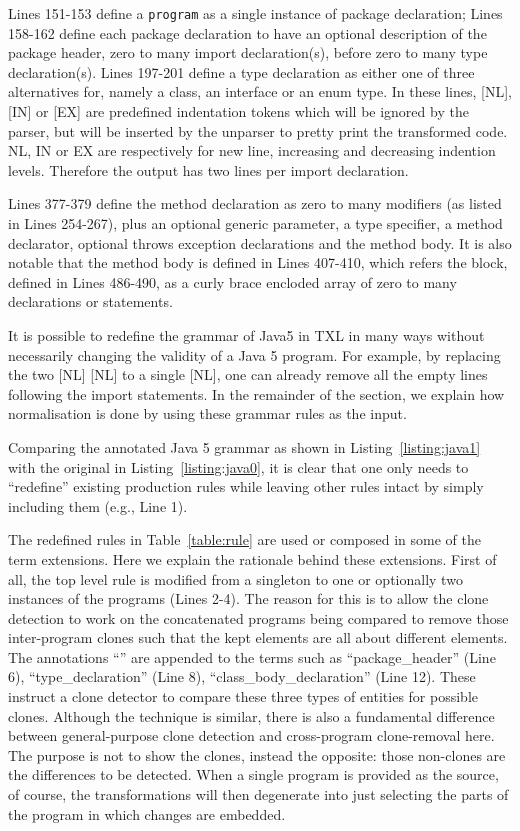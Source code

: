 \documentclass[10pt, conference, compsocconf]{IEEEtran}
\begin{document}
Lines 151-153 define a {\tt program} as a single instance of package declaration; Lines 158-162 define each package declaration to have an optional description of the package header, zero to many import declaration(s), before zero to many type declaration(s). Lines 197-201 define a type declaration as either one of three alternatives for, namely a class, an interface or an enum type. In these lines, [NL], [IN] or [EX] are predefined indentation tokens which will be ignored by the parser, but will be inserted by the unparser to pretty print the transformed code.  NL, IN or EX are respectively for new line, increasing and decreasing indention levels. Therefore the output has two lines per import declaration. 

Lines 377-379 define the method declaration as zero to many modifiers (as listed in Lines 254-267), plus an optional generic parameter, a type specifier, a method declarator, optional throws exception declarations and the method body. 
It is also notable that the method body is defined in Lines 407-410, which refers the block, defined in Lines 486-490, as a curly brace encloded array of zero to many declarations or statements.

It is possible to redefine the grammar of Java5 in TXL in many ways without necessarily changing the validity of a Java 5 program. For example, by replacing the two [NL] [NL] to a single [NL], one can already remove all the empty lines following the import statements. In the remainder of the section, we explain how normalisation is done by using these grammar rules as the input.

Comparing the annotated Java 5 grammar as shown in Listing~\ref{listing:java1} with the original in Listing~\ref{listing:java0}, it is clear that one only needs to ``redefine'' existing production rules while leaving other rules intact by simply including them (e.g., Line 1).

The redefined rules in Table~\ref{table:rule} are used or composed in some of the term extensions. Here we explain the rationale behind these extensions. First of all, the top level rule is modified from a singleton to one or optionally two instances of the programs (Lines 2-4). The reason for this is to allow the clone detection to work on the concatenated programs being compared to remove those inter-program clones such that the kept elements are all about different elements. The annotations ``'' are appended to the terms such as ``package\_header'' (Line 6), ``type\_declaration'' (Line 8), ``class\_body\_declaration'' (Line 12). These instruct a clone detector to compare these three types of entities for possible clones. Although the technique is similar, there is also a fundamental difference between general-purpose clone detection and cross-program clone-removal here. The purpose is not to show the clones, instead the opposite: those non-clones are the differences to be detected.
When a single program is provided as the source, of course, the transformations will then degenerate into just selecting the  parts of the program in which changes are embedded.
\end{document}
